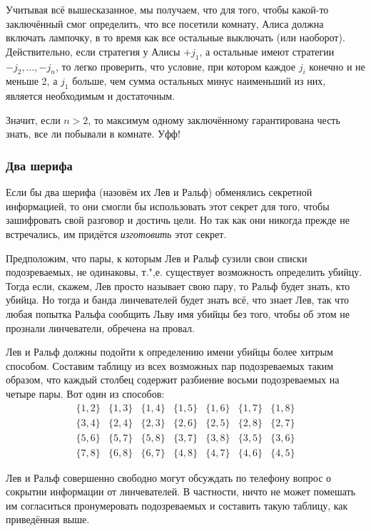 \documentclass[twoside]{book}
\begin{document}
Учитывая всё вышесказанное, мы получаем, что для того, чтобы какой-то заключённый смог определить, что все посетили комнату,
Алиса должна включать лампочку, в то время как все остальные выключать (или наоборот).
Действительно, если стратегия у Алисы $+j_1$, а остальные имеют стратегии  $-j_2,\dots,-j_n$, то легко проверить, что условие, при котором каждое $j_i$ конечно и не меньше 2, а $j_1$ больше, чем сумма остальных минус наименьший из них, является необходимым и достаточным.

Значит, если $n>2$, то максимум одному заключённому гарантирована честь знать, все ли побывали в комнате.
Уфф!

\subsubsection*{Два шерифа}%

Если бы два шерифа (назовём их Лев и Ральф) обменялись секретной информацией, то они смогли бы использовать этот секрет для того, чтобы зашифровать свой разговор и достичь цели.
Но так как они никогда прежде не встречались, им придётся \emph{изготовить} этот секрет.

\medskip

Предположим, что пары, к которым Лев и Ральф сузили свои списки подозреваемых, не одинаковы, т.",е. существует возможность определить убийцу.
Тогда если, скажем, Лев просто называет свою пару, то Ральф будет знать, кто убийца.
Но тогда и банда линчевателей будет знать всё, что знает Лев, так что любая попытка Ральфа сообщить Льву имя убийцы без того, чтобы об этом не прознали линчеватели, обречена на провал.

Лев и Ральф должны подойти к определению имени убийцы более хитрым способом.
Составим таблицу из всех возможных пар подозреваемых таким образом, что каждый столбец содержит разбиение восьми подозреваемых на четыре пары.
Вот один из способов:
\[
\begin{matrix}
\{1,2\}&\{1,3\}&\{1,4\}&\{1,5\}&\{1,6\}&\{1,7\}&\{1,8\}
\\
\{3,4\}&\{2,4\}&\{2,3\}&\{2,6\}&\{2,5\}&\{2,8\}&\{2,7\}
\\
\{5,6\}&\{5,7\}&\{5,8\}&\{3,7\}&\{3,8\}&\{3,5\}&\{3,6\}
\\
\{7,8\}&\{6,8\}&\{6,7\}&\{4,8\}&\{4,7\}&\{4,6\}&\{4,5\}
\end{matrix}
\]


Лев и Ральф совершенно свободно могут обсуждать по телефону вопрос о сокрытии информации от линчевателей.
В частности, ничто не может помешать им согласиться пронумеровать подозреваемых и составить такую таблицу, как приведённая выше.
\end{document}
